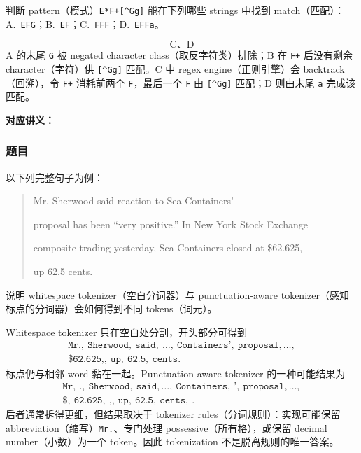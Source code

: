 判断 pattern（模式）\verb|E*F+[^Gg]| 能在下列哪些 strings 中找到 match（匹配）：A.~\texttt{EFG}；B.~\texttt{EF}；C.~\texttt{FFF}；D.~\texttt{EFFa}。

\begin{checkedsolution}
\[
  \boxed{\text{C、D}}
\]
A 的末尾 \texttt{G} 被 negated character class（取反字符类）排除；B 在 \texttt{F+} 后没有剩余 character（字符）供 \verb|[^Gg]| 匹配。C 中 regex engine（正则引擎）会 backtrack（回溯），令 \texttt{F+} 消耗前两个 \texttt{F}，最后一个 \texttt{F} 由 \verb|[^Gg]| 匹配；D 则由末尾 \texttt{a} 完成该匹配。
\end{checkedsolution}


\textbf{对应讲义：}

\subsubsection*{题目}

以下列完整句子为例：
\begin{quote}
\small\ttfamily
Mr. Sherwood said reaction to Sea Containers'\par
proposal has been ``very positive.'' In New York Stock Exchange\par
composite trading yesterday, Sea Containers closed at \$62.625,\par
up 62.5 cents.
\end{quote}
说明 whitespace tokenizer（空白分词器）与 punctuation-aware tokenizer（感知标点的分词器）会如何得到不同 tokens（词元）。

\begin{checkedsolution}
Whitespace tokenizer 只在空白处分割，开头部分可得到
\[
\begin{array}{l}
\texttt{Mr.},\ \texttt{Sherwood},\ \texttt{said},\ \ldots,\ \texttt{Containers'},\ \texttt{proposal},\ldots,\\
\texttt{\$62.625,},\ \texttt{up},\ \texttt{62.5},\ \texttt{cents.}
\end{array}
\]
标点仍与相邻 word 黏在一起。Punctuation-aware tokenizer 的一种可能结果为
\[
\begin{array}{l}
\texttt{Mr},\ \texttt{.},\ \texttt{Sherwood},\ \texttt{said},\ldots,\ \texttt{Containers},\ \texttt{'},\ \texttt{proposal},\ldots,\\
\texttt{\$},\ \texttt{62.625},\ \texttt{,},\ \texttt{up},\ \texttt{62.5},\ \texttt{cents},\ \texttt{.}
\end{array}
\]
后者通常拆得更细，但结果取决于 tokenizer rules（分词规则）：实现可能保留 abbreviation（缩写）\texttt{Mr.}、专门处理 possessive（所有格），或保留 decimal number（小数）为一个 token。因此 tokenization 不是脱离规则的唯一答案。
\end{checkedsolution}

